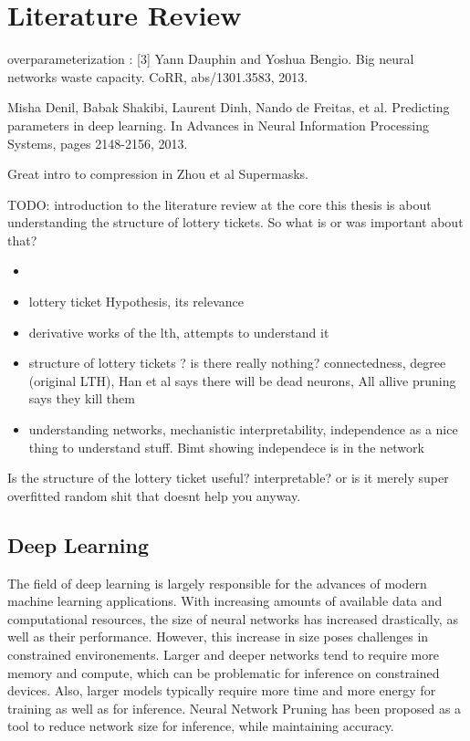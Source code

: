 \section{Literature Review}

overparameterization : [3] Yann Dauphin and Yoshua Bengio. Big neural networks waste capacity. CoRR, abs/1301.3583, 2013.

Misha Denil, Babak Shakibi, Laurent Dinh, Nando de Freitas, et al. Predicting parameters in deep learning. In Advances in Neural Information Processing Systems, pages 2148-2156, 2013.

Great intro to compression in Zhou et al Supermasks.

TODO: introduction to the literature review  
at the core this thesis is about understanding the structure of lottery tickets. So what is or was important about that?
\begin{itemize}
    \item 
    \item lottery ticket Hypothesis, its relevance 
    \item derivative works of the lth, attempts to understand it
    \item structure of lottery tickets ? is there really nothing? connectedness, degree (original LTH), Han et al says there will be dead neurons, All allive pruning says they kill them
    \item understanding networks, mechanistic interpretability, independence as a nice thing to understand stuff. Bimt showing independece is in the network
\end{itemize}

Is the structure of the lottery ticket useful? interpretable? or is it merely super overfitted random shit that doesnt help you anyway.

\subsection{Deep Learning}
The field of deep learning is largely responsible for the advances of modern machine learning applications.
With increasing amounts of available data and computational resources, the size of neural networks has increased drastically, as well as their performance.
However, this increase in size poses challenges in constrained environements.
Larger and deeper networks tend to require more memory and compute, which can be problematic for inference on constrained devices.
Also, larger models typically require more time and more energy for training as well as for inference.
Neural Network Pruning \autocite{LeCun, OptimalBrainSurgeon, HanEtAl15, PruningFiltersForEfficientConvets} has been proposed as a tool to reduce network size for inference, while maintaining accuracy.

